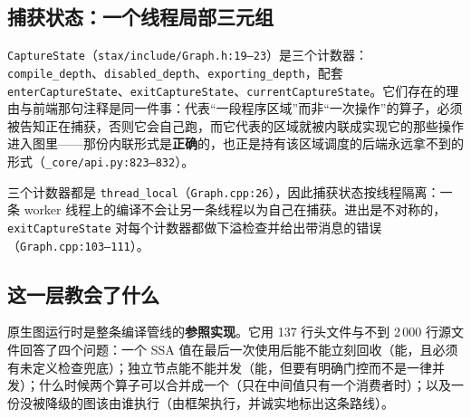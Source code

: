 \subsection{捕获状态：一个线程局部三元组}

\texttt{CaptureState}（\texttt{stax/include/Graph.h:19--23}）是三个计数器：\texttt{compile\_depth}、\texttt{disabled\_depth}、\texttt{exporting\_depth}，配套 \texttt{enterCaptureState}、\texttt{exitCaptureState}、\texttt{currentCaptureState}。它们存在的理由与前端那句注释是同一件事：代表“一段程序区域”而非“一次操作”的算子，必须被告知正在捕获，否则它会自己跑，而它代表的区域就被内联成实现它的那些操作进入图里——那份内联形式是\textbf{正确}的，也正是持有该区域调度的后端永远拿不到的形式（\texttt{\_core/api.py:823--832}）。

三个计数器都是 \texttt{thread\_local}（\texttt{Graph.cpp:26}），因此捕获状态按线程隔离：一条 worker 线程上的编译不会让另一条线程以为自己在捕获。进出是不对称的，\texttt{exitCaptureState} 对每个计数器都做下溢检查并给出带消息的错误（\texttt{Graph.cpp:103--111}）。

\subsection{这一层教会了什么}

\begin{tpnote}[把三章连起来看]
原生图运行时是整条编译管线的\textbf{参照实现}。它用 137 行头文件与不到 2\,000 行源文件回答了四个问题：一个 SSA 值在最后一次使用后能不能立刻回收（能，且必须有未定义检查兜底）；独立节点能不能并发（能，但要有明确门控而不是一律并发）；什么时候两个算子可以合并成一个（只在中间值只有一个消费者时）；以及一份没被降级的图该由谁执行（由框架执行，并诚实地标出这条路线）。
\end{tpnote}